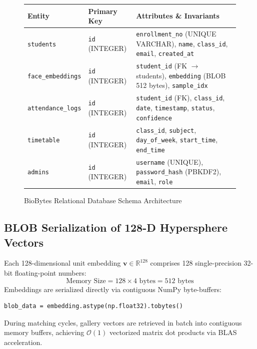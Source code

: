 \documentclass[12pt,a4paper,oneside]{report}
\begin{document}
\begin{figure}[htbp]
\centering
\small
\renewcommand{\arraystretch}{1.2}
\begin{tabular}{|l|l|p{8.5cm}|}
\hline
\textbf{Entity} & \textbf{Primary Key} & \textbf{Attributes \& Invariants} \\
\hline
\texttt{students} & \texttt{id} (INTEGER) & \texttt{enrollment\_no} (UNIQUE VARCHAR), \texttt{name}, \texttt{class\_id}, \texttt{email}, \texttt{created\_at} \\
\texttt{face\_embeddings} & \texttt{id} (INTEGER) & \texttt{student\_id} (FK $\to$ students), \texttt{embedding} (BLOB 512 bytes), \texttt{sample\_idx} \\
\texttt{attendance\_logs} & \texttt{id} (INTEGER) & \texttt{student\_id} (FK), \texttt{class\_id}, \texttt{date}, \texttt{timestamp}, \texttt{status}, \texttt{confidence} \\
\texttt{timetable} & \texttt{id} (INTEGER) & \texttt{class\_id}, \texttt{subject}, \texttt{day\_of\_week}, \texttt{start\_time}, \texttt{end\_time} \\
\texttt{admins} & \texttt{id} (INTEGER) & \texttt{username} (UNIQUE), \texttt{password\_hash} (PBKDF2), \texttt{email}, \texttt{role} \\
\hline
\end{tabular}
\caption{BioBytes Relational Database Schema Architecture}
\label{fig:schema_table_consolidated}
\end{figure}

\subsection{BLOB Serialization of 128-D Hypersphere Vectors}
Each 128-dimensional unit embedding $\mathbf{v} \in \mathbb{R}^{128}$ comprises 128 single-precision 32-bit floating-point numbers:
\begin{equation}
\text{Memory Size} = 128 \times 4\text{ bytes} = 512\text{ bytes}
\end{equation}
Embeddings are serialized directly via contiguous NumPy byte-buffers:
\begin{verbatim}
blob_data = embedding.astype(np.float32).tobytes()
\end{verbatim}
During matching cycles, gallery vectors are retrieved in batch into contiguous memory buffers, achieving $\mathcal{O}(1)$ vectorized matrix dot products via BLAS acceleration.
\end{document}
